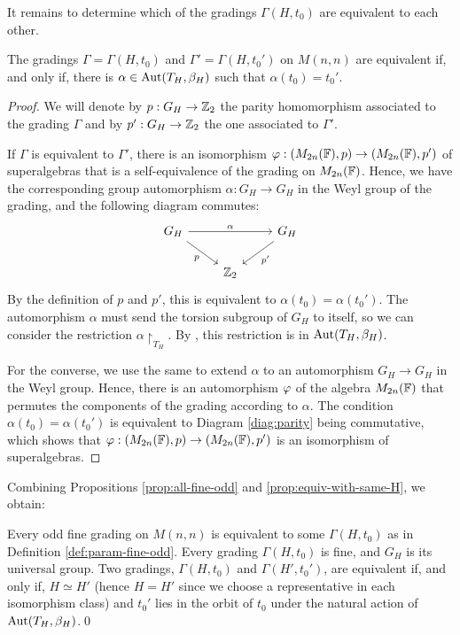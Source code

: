 It remains to determine which of the gradings $\Gamma(H, t_0)$ are equivalent to each other.

\begin{prop}\label{prop:equiv-with-same-H}
	The gradings $\Gamma = \Gamma(H, t_0)$ and $\Gamma' = \Gamma(H, t_0')$ on $M(n,n)$ are equivalent if, and only if, there is $\alpha \in \operatorname{Aut}(T_H, \beta_H)$ such that $\alpha(t_0) = t_0'$.
\end{prop}

\begin{proof}
	We will denote by $p: G_H \to \mathbb{Z}_2$ the parity homomorphism associated to the grading $\Gamma$ and by 
	$p': G_H\to \mathbb{Z}_2$ the one associated to $\Gamma'$.

	If $\Gamma$ is equivalent to $\Gamma'$, there is an isomorphism $\varphi: (M_{2n}(\mathbb{F}),p) \to (M_{2n}(\mathbb{F}),p')$ of superalgebras that is a 
	self-equivalence of the grading on $M_{2n}(\mathbb{F})$. Hence, we have the corresponding group automorphism $\alpha: G_H \to G_H$ in the Weyl group of the grading, 
	and the following diagram commutes: 
	\begin{equation*}\label{diag:parity}
		\begin{tikzcd}
			G_H \arrow[to = 2G, "\alpha"] \arrow[to = Z2, "p"'] && |[alias = 2G]| G_H \arrow[to = Z2, "p'"]\\
			& |[alias = Z2]|\ZZ_2 &
		\end{tikzcd}
	\end{equation*}
	By the definition of $p$ and $p'$, this is equivalent to $\alpha(t_0) = \alpha(t_0')$.
	The automorphism $\alpha$ must send the torsion subgroup of $G_H$ to itself, so we can consider the restriction $\alpha\restriction_{T_H}$.
	By \cite[Corrolary 2.45]{livromicha}, this restriction is in $\operatorname{Aut}(T_H, \beta_H)$.

	For the converse, we use the same \cite[Corrolary 2.45]{livromicha} to extend $\alpha$ to an automorphism $G_H\to G_H$ in the Weyl group. 
	Hence, there is an automorphism $\varphi$ of the algebra $M_{2n}(\mathbb{F})$ that permutes the components of the grading according to $\alpha$. 
	The condition $\alpha(t_0) = \alpha(t_0')$ is equivalent to Diagram \eqref{diag:parity} being commutative, which shows that $\varphi: (M_{2n}(\mathbb{F}),p) \to (M_{2n}(\mathbb{F}),p')$ is an isomorphism of superalgebras.
\end{proof}

Combining Propositions \ref{prop:all-fine-odd} and \ref{prop:equiv-with-same-H}, we obtain:

\begin{thm}\label{thm:class-fine-odd}
	Every odd fine grading on $M(n,n)$ is equivalent to some $\Gamma(H,t_0)$ as in Definition \ref{def:param-fine-odd}.
	Every grading $\Gamma(H,t_0)$ is fine, and $G_H$ is its universal group.
	Two gradings, $\Gamma(H, t_0)$ and $\Gamma(H', t_0')$, are equivalent if, and only if, $H\simeq H'$ (hence $H=H'$ since we choose a representative in each isomorphism class) and $t_0'$ lies in the orbit of $t_0$
	under the natural action of $\operatorname{Aut}(T_H, \beta_H)$.\qed
\end{thm}

